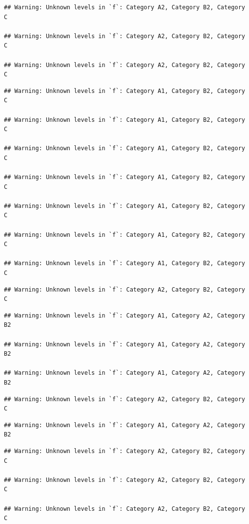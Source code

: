 \documentclass[preprint, 3p,
authoryear]{elsarticle} %
\begin{document}
\begin{verbatim}
## Warning: Unknown levels in `f`: Category A2, Category B2, Category C

## Warning: Unknown levels in `f`: Category A2, Category B2, Category C

## Warning: Unknown levels in `f`: Category A2, Category B2, Category C
\end{verbatim}

\begin{verbatim}
## Warning: Unknown levels in `f`: Category A1, Category B2, Category C

## Warning: Unknown levels in `f`: Category A1, Category B2, Category C

## Warning: Unknown levels in `f`: Category A1, Category B2, Category C

## Warning: Unknown levels in `f`: Category A1, Category B2, Category C

## Warning: Unknown levels in `f`: Category A1, Category B2, Category C

## Warning: Unknown levels in `f`: Category A1, Category B2, Category C

## Warning: Unknown levels in `f`: Category A1, Category B2, Category C
\end{verbatim}

\begin{verbatim}
## Warning: Unknown levels in `f`: Category A2, Category B2, Category C
\end{verbatim}

\begin{verbatim}
## Warning: Unknown levels in `f`: Category A1, Category A2, Category B2

## Warning: Unknown levels in `f`: Category A1, Category A2, Category B2

## Warning: Unknown levels in `f`: Category A1, Category A2, Category B2
\end{verbatim}

\begin{verbatim}
## Warning: Unknown levels in `f`: Category A2, Category B2, Category C
\end{verbatim}

\begin{verbatim}
## Warning: Unknown levels in `f`: Category A1, Category A2, Category B2
\end{verbatim}

\begin{verbatim}
## Warning: Unknown levels in `f`: Category A2, Category B2, Category C

## Warning: Unknown levels in `f`: Category A2, Category B2, Category C

## Warning: Unknown levels in `f`: Category A2, Category B2, Category C
\end{verbatim}
\end{document}
